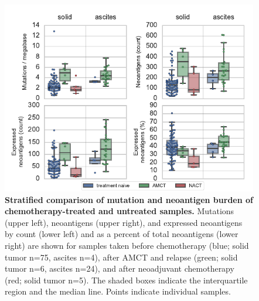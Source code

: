 \FloatBarrier

\begin{figure}
\centering
\includegraphics[scale=1.0]{figures/counts.pdf}
\caption{\textbf{Stratified comparison of mutation and neoantigen burden of chemotherapy-treated and untreated samples.} Mutations (upper left), neoantigens (upper right), and expressed neoantigens by count (lower left) and as a percent of total neoantigens (lower right) are shown for samples taken before chemotherapy (blue; solid tumor n=75, ascites n=4), after AMCT and relapse (green; solid tumor n=6, ascites n=24), and after neoadjuvant chemotherapy (red; solid tumor n=5). The shaded boxes indicate the interquartile region and the median line. Points indicate individual samples.}
\label{fig:counts}
\end{figure}

